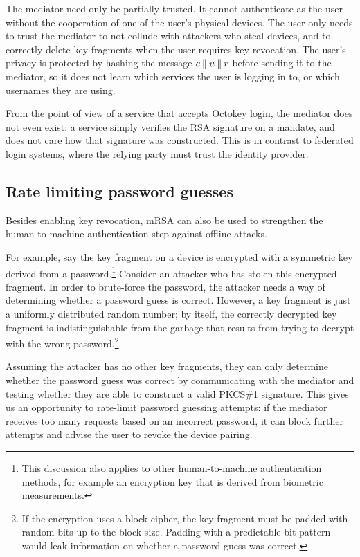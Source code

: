 The mediator need only be partially trusted. It cannot authenticate as the user without the
cooperation of one of the user's physical devices. The user only needs to trust the mediator to not
collude with attackers who steal devices, and to correctly delete key fragments when the user
requires key revocation. The user's privacy is protected by hashing the message $c \mathbin{\|} u \mathbin{\|} r$
before sending it to the mediator, so it does not learn which services the user is logging in to,
or which usernames they are using.

From the point of view of a service that accepts Octokey login, the mediator does not even exist: a
service simply verifies the RSA signature on a mandate, and does not care how that signature was
constructed. This is in contrast to federated login systems, where the relying party must trust the
identity provider.

\subsection{Rate limiting password guesses}\label{sec:ratelimit}

Besides enabling key revocation, mRSA can also be used to strengthen the human-to-machine
authentication step against offline attacks.

For example, say the key fragment on a device is encrypted with a symmetric key derived from a
password.\footnote{This discussion also applies to other human-to-machine authentication methods,
for example an encryption key that is derived from biometric measurements.} Consider an attacker who
has stolen this encrypted fragment. In order to brute-force the password, the attacker needs a way
of determining whether a password guess is correct. However, a key fragment is just a uniformly
distributed random number; by itself, the correctly decrypted key fragment is indistinguishable from
the garbage that results from trying to decrypt with the wrong password.\footnote{If the encryption
uses a block cipher, the key fragment must be padded with random bits up to the block size. Padding
with a predictable bit pattern would leak information on whether a password guess was correct.}

Assuming the attacker has no other key fragments, they can only determine whether the password guess
was correct by communicating with the mediator and testing whether they are able to construct a
valid PKCS\#1 signature. This gives us an opportunity to rate-limit password guessing attempts: if
the mediator receives too many requests based on an incorrect password, it can block further
attempts and advise the user to revoke the device pairing.

